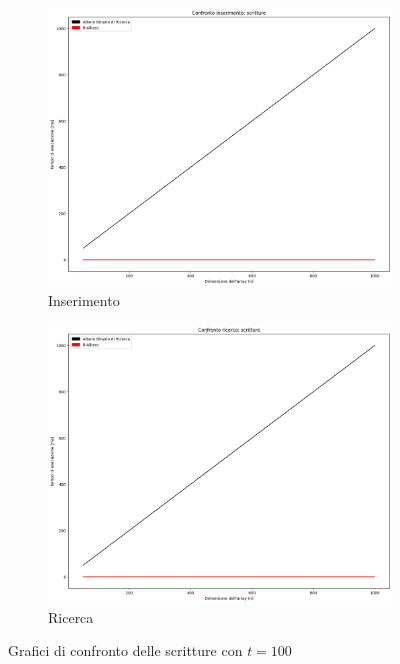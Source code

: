 \begin{figure}[H]
    \centering
    \begin{subfigure}[b]{0.49\textwidth}
        \centering
        \includegraphics[width=\textwidth]{comparison-graphs/insert-w-t100.png}
        \caption{Inserimento}
        \label{fig:compgraphinsertwrite100}
    \end{subfigure}
    \hfill
    \begin{subfigure}[b]{0.49\textwidth}
        \centering
        \includegraphics[width=\textwidth]{comparison-graphs/search-w-t100.png}
        \caption{Ricerca}
        \label{fig:compgraphsearchwrite100}
    \end{subfigure}
    \caption{Grafici di confronto delle scritture con $t=100$}
    \label{fig:compgraphread100}
\end{figure}



